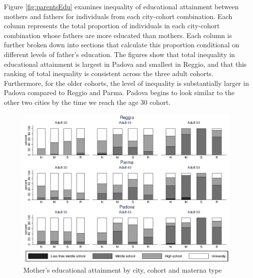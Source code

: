Figure \ref{fig:parentsEdu} examines inequality of educational attainment between mothers and fathers for individuals from each city-cohort combination. Each column represents the total proportion of individuals in each city-cohort combination whose fathers are more educated than mothers. Each column is further broken down into sections that calculate this proportion conditional on different levels of father's education. The figures show that total inequality in educational attainment is largest in Padova and smallest in Reggio, and that this ranking of total inequality is consistent across the three adult cohorts. Furthermore, for the older cohorts, the level of inequality is substantially larger in Padova compared to Reggio and Parma. Padova begins to look similar to the other two cities by the time we reach the age 30 cohort. 


\begin{figure}[!htb]
	\begin{minipage}{1\textwidth}
	\centering
	\includegraphics[scale=1.2]{../../Output/image/bar_momEdu}
	\caption{Mother's educational attainment by city, cohort and materna type}
	\label{fig:momEdu}
	\end{minipage}
\end{figure}

